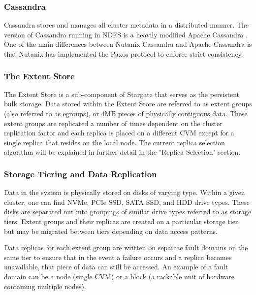 \documentclass[12pt]{article}
\begin{document}
    \subsubsection{Cassandra}

    Cassandra stores and manages all cluster metadata in a distributed manner.
    The version of Cassandra running in NDFS is a heavily modified Apache
    Cassandra \cite{cassandra}. One of the main differences between Nutanix
    Cassandra and Apache Cassandra is that Nutanix has implemented the Paxos
    \cite{paxos2005} protocol to enforce strict consistency.

    \subsubsection{The Extent Store}

    The Extent Store is a sub-component of Stargate that serves as the
    persistent bulk storage. Data stored within the Extent Store are referred
    to as extent groups (also referred to as egroups), or 4MB pieces of
    physically contiguous data. These extent groups are replicated a number of
    times dependent on the cluster replication factor and each replica is
    placed on a different CVM except for a single replica that resides on the
    local node. The current replica selection algorithm will be explained in
    further detail in the "Replica Selection" section.

    \subsubsection{Storage Tiering and Data Replication}

    Data in the system is physically stored on disks of varying type. Within a
    given cluster, one can find NVMe, PCIe SSD, SATA SSD, and HDD drive types.
    These disks are separated out into groupings of similar drive types
    referred to as storage tiers. Extent groups and their replicas are created
    on a particular storage tier, but may be migrated between tiers depending
    on data access patterns.

    Data replicas for each extent group are written on separate fault domains
    on the same tier to ensure that in the event a failure occurs and a
    replica becomes unavailable, that piece of data can still be accessed. An
    example of a fault domain can be a node (single CVM) or a block (a rackable
    unit of hardware containing multiple nodes). 
\end{document}
